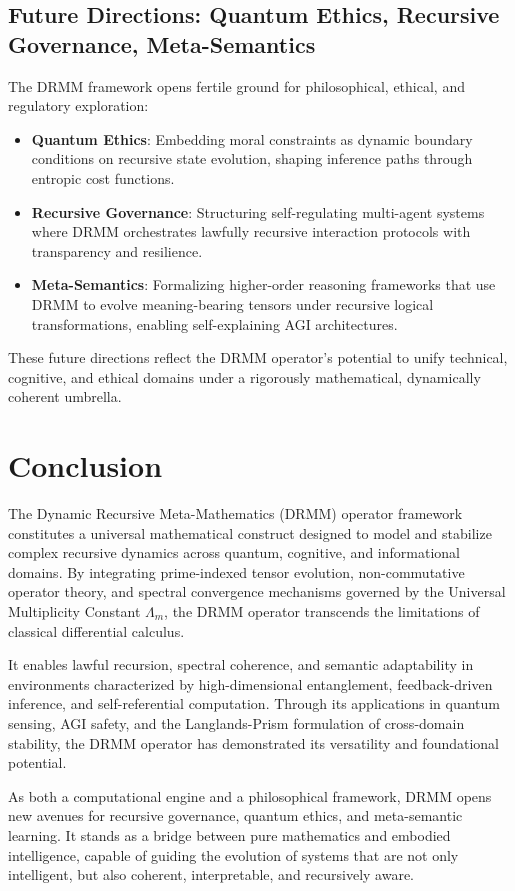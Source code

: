 \documentclass{article}
\theoremstyle{plain}
\begin{document}
\subsection{Future Directions: Quantum Ethics, Recursive Governance, Meta-Semantics}

The DRMM framework opens fertile ground for philosophical, ethical, and regulatory exploration:
\begin{itemize}
    \item \textbf{Quantum Ethics}: Embedding moral constraints as dynamic boundary conditions on recursive state evolution, shaping inference paths through entropic cost functions.
    \item \textbf{Recursive Governance}: Structuring self-regulating multi-agent systems where DRMM orchestrates lawfully recursive interaction protocols with transparency and resilience.
    \item \textbf{Meta-Semantics}: Formalizing higher-order reasoning frameworks that use DRMM to evolve meaning-bearing tensors under recursive logical transformations, enabling self-explaining AGI architectures.
\end{itemize}
These future directions reflect the DRMM operator’s potential to unify technical, cognitive, and ethical domains under a rigorously mathematical, dynamically coherent umbrella.

\section{Conclusion}

The Dynamic Recursive Meta-Mathematics (DRMM) operator framework constitutes a universal mathematical construct designed to model and stabilize complex recursive dynamics across quantum, cognitive, and informational domains. By integrating prime-indexed tensor evolution, non-commutative operator theory, and spectral convergence mechanisms governed by the Universal Multiplicity Constant $\Lambda_m$, the DRMM operator transcends the limitations of classical differential calculus.

It enables lawful recursion, spectral coherence, and semantic adaptability in environments characterized by high-dimensional entanglement, feedback-driven inference, and self-referential computation. Through its applications in quantum sensing, AGI safety, and the Langlands-Prism formulation of cross-domain stability, the DRMM operator has demonstrated its versatility and foundational potential.

As both a computational engine and a philosophical framework, DRMM opens new avenues for recursive governance, quantum ethics, and meta-semantic learning. It stands as a bridge between pure mathematics and embodied intelligence, capable of guiding the evolution of systems that are not only intelligent, but also coherent, interpretable, and recursively aware.









\nocite{*}


\end{document}
